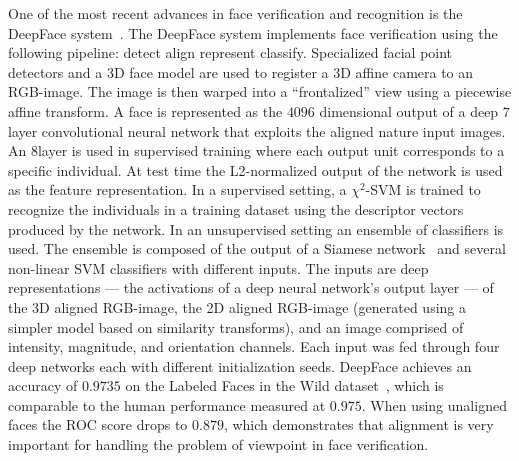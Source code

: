         One of the most recent advances in face verification and recognition is the DeepFace
          system~\cite{taigman_deepface_2014}.
        The DeepFace system implements face verification using the following pipeline:
        detect \rpipe{} align \rpipe{} represent \rpipe{} classify.
        Specialized facial point detectors and a 3D face model are used to register a 3D affine camera to an
          RGB-image.
        The image is then warped into a ``frontalized'' view using a piecewise affine transform.
        A face is represented as the $4096$ dimensional output of a deep $7$ layer convolutional neural network
          that exploits the aligned nature input images.
        An $8$\th layer is used in supervised training where each output unit corresponds to a specific
          individual.
        At test time the L2-normalized output of the network is used as the feature representation.
        In a supervised setting, a $\chi^2$-SVM is trained to recognize the individuals in a training dataset
          using the descriptor vectors produced by the network.
        In an unsupervised setting an ensemble of classifiers is used.
        The ensemble is composed of the output of a Siamese network~\cite{chopra_learning_2005} and 
          several non-linear SVM classifiers with different inputs.
        The inputs are deep representations --- the activations of a deep neural network's output layer --- of
          the 3D aligned RGB-image, the 2D aligned RGB-image (generated using a simpler model based on similarity
          transforms), and an image comprised of intensity, magnitude, and orientation channels.
        Each input was fed through four deep networks each with different initialization seeds.
        DeepFace achieves an accuracy of $0.9735$ on the Labeled Faces in the Wild
          dataset~\cite{huang_labeled_2007}, which is comparable to the human performance measured at $0.975$.
        When using unaligned faces the ROC score drops to $0.879$, which demonstrates that alignment is very
          important for handling the problem of viewpoint in face verification.

